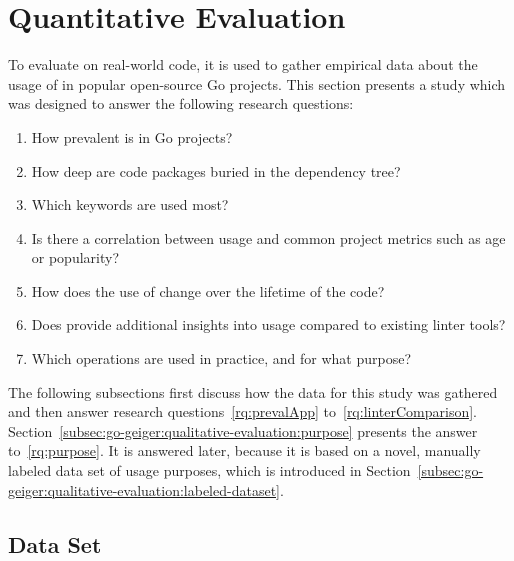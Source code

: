 
\section{Quantitative Evaluation}\label{sec:go-geiger:quantitative-evaluation}

To evaluate \toolGeiger{} on real-world code, it is used to gather empirical data about the usage of \unsafe{} in
popular open-source Go projects.
This section presents a study which was designed to answer the following research questions:

\begin{enumerate}[left=0.5cm, label={RQ\arabic*}]
    \item How prevalent is \unsafe{} in Go projects? \label{rq:prevalApp}
    \item How deep are \unsafe{} code packages buried in the dependency tree? \label{rq:depsDepth}
    \item Which \unsafe{} keywords are used most? \label{rq:distTypes}
    \item Is there a correlation between \unsafe{} usage and common project metrics such as age or popularity? \label{rq:popularity}
    \item How does the use of \unsafe{} change over the lifetime of the code? \label{rq:changeTime}
    \item Does \toolGeiger{} provide additional insights into \unsafe{} usage compared to existing linter tools? \label{rq:linterComparison}
    \item Which \unsafe{} operations are used in practice, and for what purpose? \label{rq:purpose}
\end{enumerate}

The following subsections first discuss how the data for this study was gathered and then answer research
questions~\ref{rq:prevalApp} to~\ref{rq:linterComparison}.
Section~\ref{subsec:go-geiger:qualitative-evaluation:purpose} presents the answer to~\ref{rq:purpose}.
It is answered later, because it is based on a novel, manually labeled data set of \unsafe{} usage purposes, which is
introduced in Section~\ref{subsec:go-geiger:qualitative-evaluation:labeled-dataset}.



\subsection{Data Set}\label{subsec:go-geiger:evaluation:data-set}


